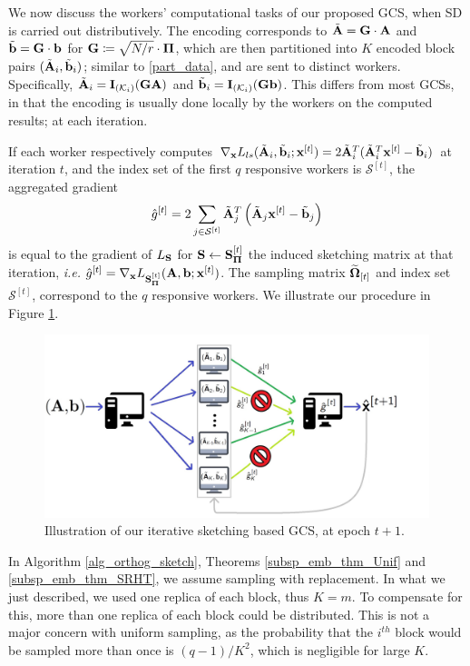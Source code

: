 \documentclass[journal,letterpaper,onecolumn,twoside,nofonttune]{IEEEtran}
\newcommand{\K}{\mathcal{K}}
\newcommand{\xb}{\bold{x}}
\newcommand{\Gb}{\bold{G}}
\newcommand{\Pibold}{\bold{\Pi}}
\newcommand{\Omb}{\bold{\Omega}}
\newcommand{\Ombwt}{\widetilde{\Omb}}
\newcommand{\Scal}{\mathcal{S}}
\newcommand{\gh}{\hat{g}}
\newcommand{\Sb}{\bold{S}}
\newcommand{\SbPi}{\Sb_{\Pibold}}
\newcommand{\Ab}{\bold{A}}
\newcommand{\Abt}{{\tilde{\bold{A}}}}
\newcommand{\bb}{\bold{b}}
\newcommand{\bbt}{\tilde{\bold{b}}}
\newcommand{\Ib}{\bold{I}}
\begin{document}
We now discuss the workers' computational tasks of our proposed GCS, when SD is carried out distributively. The encoding corresponds to $\Abt=\Gb\cdot\Ab$ and $\bbt=\Gb\cdot\bb$ for $\Gb\coloneqq\sqrt{N/r}\cdot\Pibold$, which are then partitioned into $K$ encoded block pairs $(\Abt_i,\bbt_i)$; similar to \eqref{part_data}, and are sent to distinct workers. Specifically, $\Abt_i=\Ib_{(\K_i)}(\Gb\Ab)$ and $\bbt_i=\Ib_{(\K_i)}(\Gb\bb)$. This differs from most GCSs, in that the encoding is usually done locally by the workers on the computed results; at each iteration.

If each worker respectively computes $\nabla_{\xb}L_{ls}(\Abt_i,\bbt_i;\xb^{[t]})=2\Abt_i^T(\Abt_i^T\xb^{[t]}-\bbt_i)$ at iteration $t$, and the index set of the first $q$ responsive workers is $\Scal^{[t]}$, the aggregated gradient
\begin{equation}
\label{gr_update}
  \gh^{[t]} = 2\sum\limits_{j\in\Scal^{[t]}}\Abt_j^T\left(\Abt_j\xb^{[t]}-\bbt_j\right)
\end{equation}
is equal to the gradient of $L_{\Sb}$ for $\Sb\gets\SbPi^{[t]}$ the induced sketching matrix at that iteration, \textit{i.e.} $\gh^{[t]}=\nabla_{\xb}L_{\SbPi^{[t]}}(\Ab,\bb;\xb^{[t]})$. The sampling matrix $\Ombwt_{[t]}$ and index set $\Scal^{[t]}$, correspond to the $q$ responsive workers. We illustrate our procedure in Figure \ref{it_sketch_figure}.

\begin{figure}[h]
  \centering
    \includegraphics[scale=.17]{iterative_sketching_GC.jpg}
    \caption{Illustration of our iterative sketching based GCS, at epoch $t+1$.}
  \label{it_sketch_figure}
\end{figure}

In Algorithm \ref{alg_orthog_sketch}, Theorems \ref{subsp_emb_thm_Unif} and \ref{subsp_emb_thm_SRHT}, we assume sampling with replacement. In what we just described, we used one replica of each block, thus $K=m$. To compensate for this, more than one replica of each block could be distributed. This is not a major concern with uniform sampling, as the probability that the $i^{th}$ block would be sampled more than once is $(q-1)/K^2$, which is negligible for large $K$.
\end{document}
